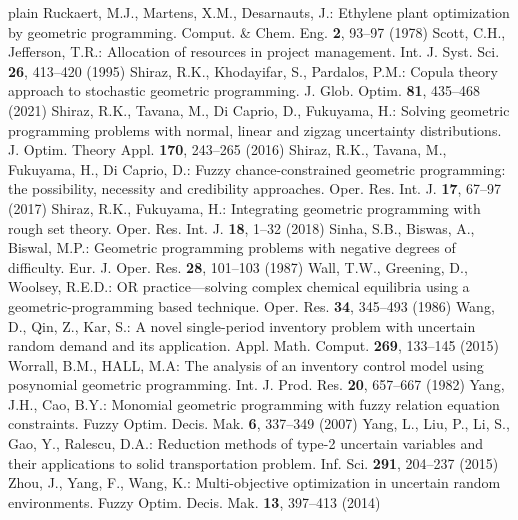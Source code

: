 \begin{thebibliography}{plain}
 Ruckaert, M.J., Martens, X.M., Desarnauts, J.: Ethylene plant optimization by geometric programming. Comput. \& Chem. Eng. {\bf 2}, 93--97 (1978)
 Scott, C.H., Jefferson, T.R.: Allocation of resources in project management. Int. J. Syst. Sci. {\bf 26}, 413--420 (1995)
 Shiraz, R.K., Khodayifar, S., Pardalos, P.M.: Copula theory approach to stochastic geometric programming. J. Glob. Optim. {\bf 81}, 435--468 (2021)
 Shiraz, R.K., Tavana, M., Di Caprio, D., Fukuyama, H.: Solving geometric programming problems with normal, linear and zigzag uncertainty distributions. J. Optim. Theory Appl. {\bf 170}, 243--265 (2016)
 Shiraz, R.K., Tavana, M., Fukuyama, H., Di Caprio, D.: Fuzzy chance-constrained geometric programming: the possibility, necessity and credibility approaches. Oper. Res. Int. J. {\bf 17}, 67--97 (2017)
 Shiraz, R.K., Fukuyama, H.: Integrating geometric programming with rough set theory. Oper. Res. Int. J. {\bf 18}, 1--32 (2018)
 Sinha, S.B., Biswas, A., Biswal, M.P.: Geometric programming problems with negative degrees of difficulty. Eur. J. Oper. Res. {\bf 28}, 101--103 (1987)
 Wall, T.W., Greening, D., Woolsey, R.E.D.: OR practice—solving complex chemical equilibria using a geometric-programming based technique. Oper. Res. {\bf 34}, 345--493 (1986)
 Wang, D., Qin, Z., Kar, S.: A novel single-period inventory problem with uncertain random demand and its application. Appl. Math. Comput. {\bf 269}, 133--145 (2015)
 Worrall, B.M., HALL, M.A: The analysis of an inventory control model using posynomial geometric programming. Int. J. Prod. Res. {\bf 20}, 657--667 (1982)
 Yang, J.H., Cao, B.Y.: Monomial geometric programming with fuzzy relation equation constraints. Fuzzy Optim. Decis. Mak. {\bf 6}, 337--349 (2007)
 Yang, L., Liu, P., Li, S., Gao, Y., Ralescu, D.A.: Reduction methods of type-2 uncertain variables and their applications to solid transportation problem. Inf. Sci. {\bf 291}, 204--237 (2015)
 Zhou, J., Yang, F., Wang, K.: Multi-objective optimization in uncertain random environments. Fuzzy Optim. Decis. Mak. {\bf 13}, 397--413 (2014)
\end{thebibliography}




